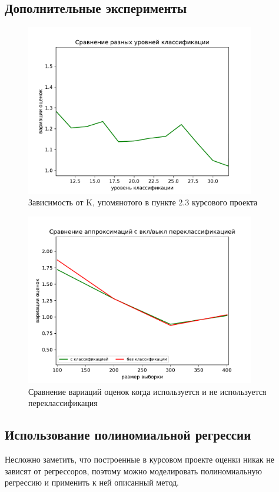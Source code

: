 \newpage
\subsection{Дополнительные эксперименты}
\begin{figure}[h!]
    \centering
    \includegraphics[width=100mm]{../images/different_recl_level.pdf}
    \caption{Зависимость от K, упомянотого в пункте 2.3 курсового проекта\label{overflow}}
    \label{pic1}
\end{figure}

\begin{figure}[h!]
    \centering
    \includegraphics[width=100mm]{../images/on_off_recl.pdf}
    \caption{Сравнение вариаций оценок когда используется и не используется переклассификация\label{overflow}}
    \label{pic1}
\end{figure}

\newpage

\subsection{Использование полиномиальной регрессии}
Несложно заметить, что построенные в курсовом проекте оценки никак не зависят от регрессоров, поэтому можно моделировать полиномиальную регрессию и применить к ней описанный метод.
